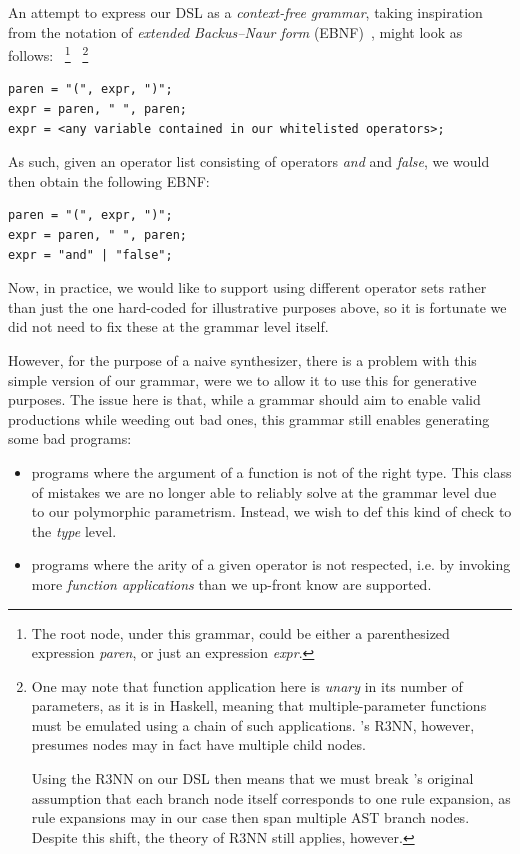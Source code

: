 \documentclass{article}
\begin{document}
An attempt to express our DSL
as a \emph{context-free grammar},
taking inspiration from the notation of \emph{extended Backus–Naur form} (EBNF)~\citep{standard1996ebnf},
might look as follows:%
~\footnote{
    The root node, under this grammar,
    could be either a parenthesized expression \emph{paren},
    or just an expression \emph{expr}.
}%
~\footnote{
    One may note that function application here is \emph{unary} in its number of parameters, as it is in Haskell,
    meaning that multiple-parameter functions must be emulated using a chain of such applications.
    \citet{nsps}'s R3NN, however, presumes nodes may in fact have multiple child nodes.

    Using the R3NN on our DSL then means that we must break \citet{nsps}'s original
    assumption that each branch node itself corresponds to one rule expansion,
    as rule expansions may in our case then span multiple AST branch nodes.
    Despite this shift, the theory of R3NN still applies, however.
}

\begin{verbatim}
paren = "(", expr, ")";
expr = paren, " ", paren;
expr = <any variable contained in our whitelisted operators>;
\end{verbatim}

As such, given an operator list consisting of operators \emph{and} and \emph{false},
we would then obtain the following EBNF:

\begin{verbatim}
paren = "(", expr, ")";
expr = paren, " ", paren;
expr = "and" | "false";
\end{verbatim}

Now, in practice, we would like to support using different operator sets
rather than just the one hard-coded for illustrative purposes above,
so it is fortunate we did not need to fix these at the grammar level itself.

However, for the purpose of a naive synthesizer,
there is a problem with this simple version of our grammar,
were we to allow it to use this for generative purposes.
The issue here is that,
while a grammar should aim to enable valid productions while weeding out bad ones,
this grammar still enables generating some bad programs:
\begin{itemize}
    \item programs where the argument of a function is not of the right type.
        This class of mistakes we are no longer able to reliably solve
        at the grammar level due to our polymorphic parametrism.
        Instead, we wish to def this kind of check to the \emph{type} level.
    \item programs where the arity of a given operator is not respected, i.e.
        by invoking more \emph{function applications} than we up-front know are supported.
\end{itemize}
\end{document}
